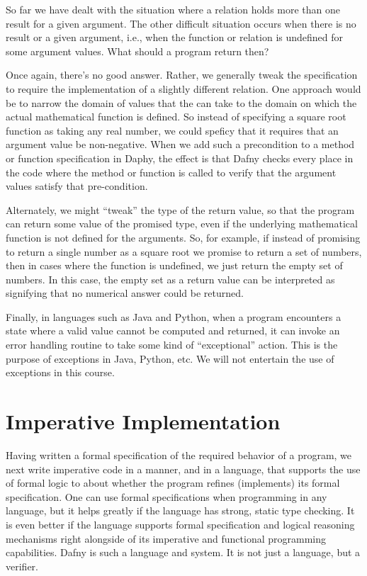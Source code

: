 \documentclass[letterpaper,10pt,english]{sphinxmanual}
\begin{document}
So far we have dealt with the situation where a relation holds more
than one result for a given argument. The other difficult situation
occurs when there is no result or a given argument, i.e., when the
function or relation is undefined for some argument values. What
should a program return then?

Once again, there’s no good answer. Rather, we generally tweak the
specification to require the implementation of a slightly different
relation. One approach would be to narrow the domain of values that
the  can take to the domain on which the actual mathematical
function is defined. So instead of specifying a square root function
as taking any real number, we could speficy that it requires that an
argument value be non-negative. When we add such a precondition to a
method or function specification in Daphy, the effect is that Dafny
checks every place in the code where the method or function is called
to verify that the argument values satisfy that pre-condition.

Alternately, we might “tweak” the type of the return value, so that
the program can return some value of the promised type, even if the
underlying mathematical function is not defined for the arguments. So,
for example, if instead of promising to return a single number as a
square root we promise to return a set of numbers, then in cases where
the function is undefined, we just return the empty set of numbers.
In this case, the empty set as a return value can be interpreted as
signifying that no numerical answer could be returned.

Finally, in languages such as Java and Python, when a program
encounters a state where a valid value cannot be computed and
returned, it can invoke an error handling routine to take some kind of
“exceptional” action. This is the purpose of exceptions in Java,
Python, etc. We will not entertain the use of exceptions in this
course.


\section{Imperative Implementation}
\label{\detokenize{05-putting-it-together:imperative-implementation}}
Having written a formal specification of the required 
behavior of a program, we next write imperative code in a manner, and
in a language, that supports the use of formal logic to  about
whether the program refines (implements) its formal specification. One
can use formal specifications when programming in any language, but it
helps greatly if the language has strong, static type checking. It is
even better if the language supports formal specification and logical
reasoning mechanisms right alongside of its imperative and functional
programming capabilities. Dafny is such a language and system. It is
not just a language, but a verifier.
\end{document}
